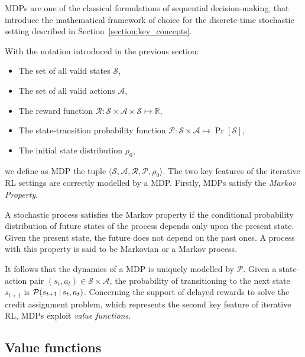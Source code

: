 \aclp{MDP} are one of the classical formulations of sequential decision-making, that introduce the mathematical framework of choice for the discrete-time stochastic setting described in Section~\ref{section:key_concepts}.

With the notation introduced in the previous section:
%
\begin{itemize}
    \item The set of all valid states $\mathcal{S}$,
    \item The set of all valid actions $\mathcal{A}$,
    \item The reward function $\mathcal{R}: \mathcal{S} \times \mathcal{A} \times \mathcal{S} \mapsto \mathbb{R}$,
    \item The state-transition probability function $\mathcal{P}: \mathcal{S} \times \mathcal{A} \mapsto \operatorname{Pr}[\mathcal{S}]$,
    \item The initial state distribution $\rho_0$, 
\end{itemize}
%
we define as \ac{MDP} the tuple $\langle \mathcal{S}, \mathcal{A}, \mathcal{R}, \mathcal{P}, \mathcal{\rho}_0 \rangle$.
%
The two key features of the iterative \ac{RL} settings are correctly modelled by a \ac{MDP}.
Firstly, \acp{MDP} satisfy the \emph{Markov Property}.
%
\begin{definition*}
%
A stochastic process satisfies the Markov property if the conditional probability distribution of future states of the process depends only upon the present state.
Given the present state, the future does not depend on the past ones.
A process with this property is said to be Markovian or a Markov process.
%
\end{definition*}
%
It follows that the dynamics of a \ac{MDP} is uniquely modelled by $\mathcal{P}$.
Given a state-action pair $(s_t, a_t) \in \mathcal{S} \times \mathcal{A}$, the probability of transitioning to the next state $s_{t+1}$ is $\mathcal{P}(s_{t+1} \operatorname{\mid} s_t, a_t)$.
Concerning the support of delayed rewards to solve the credit assignment problem, which represents the second key feature of iterative \ac{RL}, \acp{MDP} exploit \emph{value functions}.

\subsection{Value functions}
\label{section:value_functions}

